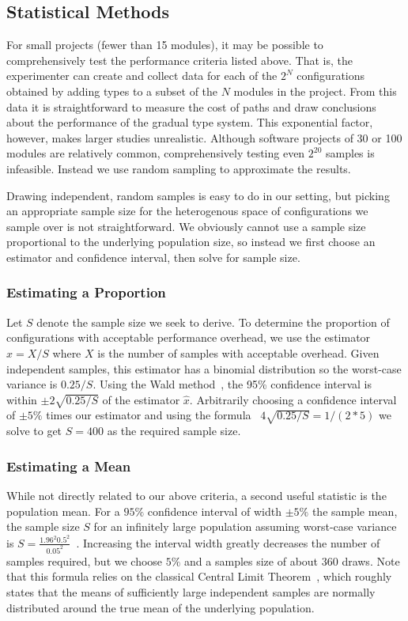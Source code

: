 \documentclass{article}
\begin{document}
\subsection{Statistical Methods}
For small projects (fewer than 15 modules), it may be possible to comprehensively test the performance criteria listed above.
That is, the experimenter can create and collect data for each of the $2^N$ configurations obtained by adding types to a subset of the $N$ modules in the project.
From this data it is straightforward to measure the cost of paths and draw conclusions about the performance of the gradual type system.
This exponential factor, however, makes larger studies unrealistic.
Although software projects of 30 or 100 modules are relatively common, comprehensively testing even $2^{20}$ samples is infeasible.
Instead we use random sampling to approximate the results.

Drawing independent, random samples is easy to do in our setting, but picking an appropriate sample size for the heterogenous space of configurations we sample over is not straightforward.
We obviously cannot use a sample size proportional to the underlying population size, so instead we first choose an estimator and confidence interval, then solve for sample size.

\subsubsection{Estimating a Proportion}
Let $S$ denote the sample size we seek to derive.
To determine the proportion of configurations with acceptable performance overhead, we use the estimator $\hat{x} = X / S$ where $X$ is the number of samples with acceptable overhead.
Given independent samples, this estimator has a binomial distribution so the worst-case variance is $0.25 / S$.
Using the Wald method~\cite{todo}, the 95\% confidence interval is within $\pm 2\sqrt{0.25 / S}$ of the estimator $\hat{x}$.
Arbitrarily choosing a confidence interval of $\pm 5\%$ times our estimator and using the formula~\cite{todo} $4\sqrt{0.25 / S} = 1 / (2 * 5)$ we solve to get $S = 400$ as the required sample size.

\subsubsection{Estimating a Mean}
While not directly related to our above criteria, a second useful statistic is the population mean.
For a $95\%$ confidence interval of width $\pm 5\%$ the sample mean, the sample size $S$ for an infinitely large population assuming worst-case variance is $S = \frac{1.96^2 0.5^2}{0.05^2}$~\cite{todo}.
Increasing the interval width greatly decreases the number of samples required, but we choose $5\%$ and a samples size of about 360 draws.
Note that this formula relies on the classical Central Limit Theorem~\cite{todo}, which roughly states that the means of sufficiently large independent samples are normally distributed around the true mean of the underlying population.
\end{document}
